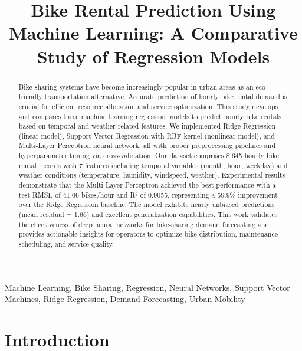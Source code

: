 \documentclass[conference]{IEEEtran}
\begin{document}
\title{Bike Rental Prediction Using Machine Learning: A Comparative Study of Regression Models}

\author{
}

\maketitle

\begin{abstract}
Bike-sharing systems have become increasingly popular in urban areas as an eco-friendly transportation alternative. Accurate prediction of hourly bike rental demand is crucial for efficient resource allocation and service optimization. This study develops and compares three machine learning regression models to predict hourly bike rentals based on temporal and weather-related features. We implemented Ridge Regression (linear model), Support Vector Regression with RBF kernel (nonlinear model), and Multi-Layer Perceptron neural network, all with proper preprocessing pipelines and hyperparameter tuning via cross-validation. Our dataset comprises 8,645 hourly bike rental records with 7 features including temporal variables (month, hour, weekday) and weather conditions (temperature, humidity, windspeed, weather). Experimental results demonstrate that the Multi-Layer Perceptron achieved the best performance with a test RMSE of 41.06 bikes/hour and R² of 0.9055, representing a 59.9\% improvement over the Ridge Regression baseline. The model exhibits nearly unbiased predictions (mean residual = 1.66) and excellent generalization capabilities. This work validates the effectiveness of deep neural networks for bike-sharing demand forecasting and provides actionable insights for operators to optimize bike distribution, maintenance scheduling, and service quality.
\end{abstract}

\begin{IEEEkeywords}
Machine Learning, Bike Sharing, Regression, Neural Networks, Support Vector Machines, Ridge Regression, Demand Forecasting, Urban Mobility
\end{IEEEkeywords}

\section{Introduction}
\label{intro}
\end{document}
